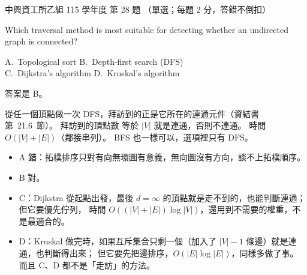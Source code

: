 \begin{pastexam}[label={px:nchu-115-is-28}]{中興資工所乙組 115 學年度 第 28 題}
（單選；每題 2 分，答錯不倒扣）

Which traversal method is most suitable for detecting whether an undirected graph is connected?

A.~Topological sort \qquad B.~Depth-first search (DFS)\\
C.~Dijkstra's algorithm \qquad D.~Kruskal's algorithm
\end{pastexam}

\begin{pastsoln}
答案是 B。

從任一個頂點做一次 DFS，拜訪到的正是它所在的連通元件（資結書第~21.6~節）。 拜訪到的頂點數
等於 $|V|$ 就是連通，否則不連通。 時間 $O(|V| + |E|)$（鄰接串列）。 BFS 也一樣可以，選項裡只有
DFS。
\begin{itemize}
\item A 錯：拓樸排序只對有向無環圖有意義，無向圖沒有方向，談不上拓樸順序。
\item B 對。
\item C：Dijkstra 從起點出發，最後 $d = \infty$ 的頂點就是走不到的，也能判斷連通；但它要優先佇列，
時間 $O((|V| + |E|)\log |V|)$，還用到不需要的權重，不是最適合的。
\item D：Kruskal 做完時，如果互斥集合只剩一個（加入了 $|V| - 1$ 條邊）就是連通，也判斷得出來；
但它要先把邊排序，$O(|E| \log |E|)$，同樣多做了事。 而且 C、D 都不是「走訪」的方法。
\end{itemize}
\end{pastsoln}
